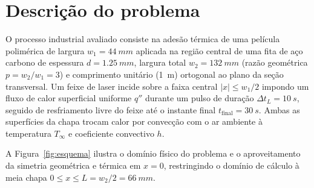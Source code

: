 \documentclass[11pt,a4paper]{article}
\begin{document}
\section{Descrição do problema}
O processo industrial avaliado consiste na adesão térmica de uma película polimérica de largura $w_1 = \SI{44}{mm}$ aplicada na região central de uma fita de aço carbono de espessura $d = \SI{1,25}{mm}$, largura total $w_2 = \SI{132}{mm}$ (razão geométrica $p = w_2/w_1 = 3$) e comprimento unitário (\SI{1}{m}) ortogonal ao plano da seção transversal. Um feixe de laser incide sobre a faixa central $|x| \le w_1/2$ impondo um fluxo de calor superficial uniforme $q''$ durante um pulso de duração $\Delta t_L = \SI{10}{s}$, seguido de resfriamento livre do feixe até o instante final $t_{\text{final}} = \SI{30}{s}$. Ambas as superfícies da chapa trocam calor por convecção com o ar ambiente à temperatura $T_\infty$ e coeficiente convectivo $h$.

A Figura~\ref{fig:esquema} ilustra o domínio físico do problema e o aproveitamento da simetria geométrica e térmica em $x = 0$, restringindo o domínio de cálculo à meia chapa $0 \le x \le L = w_2/2 = \SI{66}{mm}$.
\end{document}
